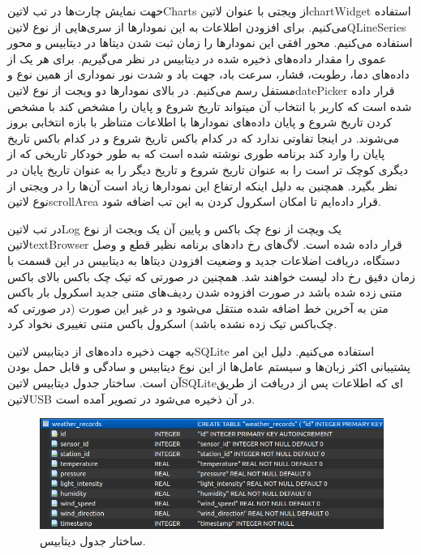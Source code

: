 حهت نمایش چارت‌ها در تب ‌لاتین{Charts} از ویجتی با عنوان ‌لاتین{chartWidget} استفاده می‌کنیم. برای افزودن اطلاعات به این نمودار‌ها از سری‌هایی از نوع ‌لاتین{QLineSeries} استفاده می‌کنیم. محور افقی این نمودار‌ها را زمان ثبت شدن دیتا‌ها در دیتابیس و محور عموی را مقدار داده‌های ذخیره شده در دیتابیس در نظر می‌گیریم. برای هر یک از داده‌های دما، رطوبت، فشار، سرعت باد، جهت باد و شدت نور نموداری از همین نوع و مستفل رسم می‌کنیم. در بالای نمودار‌ها دو ویجت از نوع ‌لاتین{datePicker} قرار داده شده است که کاربر با انتخاب آن میتواند تاریخ شروع و پایان را مشخص کند با مشخص کردن تاریخ شروع و پایان داده‌های نمودار‌ها با اطلاعات متناظر با بازه انتخابی بروز می‌شوند. در اینجا تفاوتی ندارد که در کدام باکس تاریخ شروع و در کدام باکس تاریخ پایان را وارد کند برنامه طوری نوشته شده است که به طور خودکار تاریخی که از دیگری کوچک تر است را به عنوان تاریخ شروع و تاریخ دیگر را به عنوان تاریخ پایان در نظر بگیرد. همچنین به دلیل اینکه ارتفاع این نمودار‌ها زیاد است آن‌ها را در ویجتی از نوع ‌لاتین{scrollArea} قرار داده‌ایم تا امکان اسکرول کردن به این تب اضافه شود. 

در تب ‌لاتین{Log} یک ویچت از نوع چک باکس و پایین آن یک ویجت از نوع ‌لاتین{textBrowser} قرار داده شده است. لاگ‌های رخ داد‌های برنامه نظیر قطع و وصل دستگاه، دریافت اضلاعات جدید و وضعیت افزودن دیتا‌ها به دیتابیس در این قسمت با زمان دقیق رخ داد لیست خواهند شد. همچنین در صورتی که تیک چک باکس بالای باکس متنی زده شده باشد در صورت افزوده شدن ردیف‌های متنی جدید اسکرول بار باکس متن به آخرین خط اضافه شده منتقل می‌شود و در غیر این صورت (در صورتی که چک‌باکس تیک زده نشده باشد) اسکرول باکس متنی تغییری نخواد کرد.  


به جهت ذخیره داده‌های از دیتابیس ‌لاتین{SQLite} استفاده می‌کنیم. دلیل این امر پشتیبانی اکثر زبان‌ها و سیستم عامل‌ها از این نوع دیتابیس و سادگی و قابل حمل بودن آن است. ساختار جدول دیتابیس ‌لاتین{SQLite}ای که اطلاعات پس از دریافت از طریق ‌لاتین{USB} در آن ذخیره می‌شود در تصویر  آمده است.

\begin{figure}[!h]
	\includegraphics[width=\linewidth]{Assets/dbStructure.png}
	\caption{ساختار جدول دیتابیس.}
	\label{fig:DBStructure}
\end{figure}

